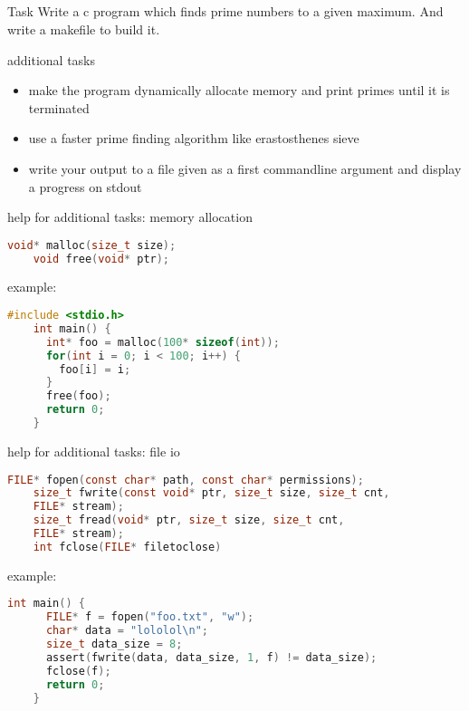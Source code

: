 \documentclass[10pt,graphics,aspectratio=169,table]{beamer}
\begin{document}
\subsection{}
\begin{frame}{Task}
  Write a c program which finds prime numbers to a given maximum.
  And write a makefile to build it.
\end{frame}
\begin{frame}{additional tasks}
  \begin{itemize}
  \item make the program dynamically allocate memory and print primes until
    it is terminated
  \item use a faster prime finding algorithm like erastosthenes sieve
  \item write your output to a file given as a first commandline
    argument and display a progress on stdout
  \end{itemize}
\end{frame}
\begin{frame}[fragile]{help for additional tasks: memory allocation}
    \begin{lstlisting}[language=c]
    void* malloc(size_t size);
    void free(void* ptr);
  \end{lstlisting}
  example:
    \begin{lstlisting}[language=c]
    #include <stdio.h>
    int main() {
      int* foo = malloc(100* sizeof(int));
      for(int i = 0; i < 100; i++) {
        foo[i] = i;
      }
      free(foo);
      return 0;
    }
  \end{lstlisting}
\end{frame}
\begin{frame}[fragile]{help for additional tasks: file io}
    \begin{lstlisting}[language=c]
    FILE* fopen(const char* path, const char* permissions);
    size_t fwrite(const void* ptr, size_t size, size_t cnt, 
    FILE* stream);
    size_t fread(void* ptr, size_t size, size_t cnt, 
    FILE* stream);
    int fclose(FILE* filetoclose)
  \end{lstlisting}
  example:
    \begin{lstlisting}[language=c]
    int main() {
      FILE* f = fopen("foo.txt", "w");
      char* data = "lololol\n";
      size_t data_size = 8;
      assert(fwrite(data, data_size, 1, f) != data_size);
      fclose(f);
      return 0;
    }
  \end{lstlisting}

\end{frame}
\end{document}
